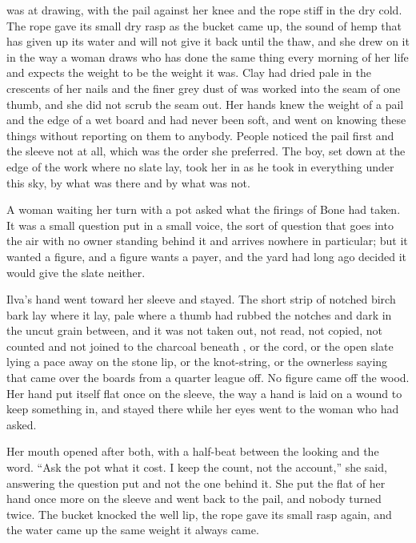 \scenebreak

 was at  drawing, with the pail against her knee and the rope stiff in the dry cold. The rope gave its small dry rasp as the bucket came up, the sound of hemp that has given up its water and will not give it back until the thaw, and she drew on it in the way a woman draws who has done the same thing every morning of her life and expects the weight to be the weight it was. Clay had dried pale in the crescents of her nails and the finer grey dust of  was worked into the seam of one thumb, and she did not scrub the seam out. Her hands knew the weight of a pail and the edge of a wet board and had never been soft, and went on knowing these things without reporting on them to anybody. People noticed the pail first and the sleeve not at all, which was the order she preferred. The boy, set down at the edge of the work where no slate lay, took her in as he took in everything under this sky, by what was there and by what was not.

A woman waiting her turn with a pot asked what the firings of Bone had taken. It was a small question put in a small voice, the sort of question that goes into the air with no owner standing behind it and arrives nowhere in particular; but it wanted a figure, and a figure wants a payer, and the yard had long ago decided it would give the slate neither.

Ilva's hand went toward her sleeve and stayed. The short strip of notched birch bark lay where it lay, pale where a thumb had rubbed the notches and dark in the uncut grain between, and it was not taken out, not read, not copied, not counted and not joined to the charcoal beneath , or the cord, or the open slate lying a pace away on the stone lip, or the knot-string, or the ownerless saying that came over the boards from a quarter league off. No figure came off the wood. Her hand put itself flat once on the sleeve, the way a hand is laid on a wound to keep something in, and stayed there while her eyes went to the woman who had asked.

Her mouth opened after both, with a half-beat between the looking and the word. “Ask the pot what it cost. I keep the count, not the account,” she said, answering the question put and not the one behind it. She put the flat of her hand once more on the sleeve and went back to the pail, and nobody turned twice. The bucket knocked the well lip, the rope gave its small rasp again, and the water came up the same weight it always came.

